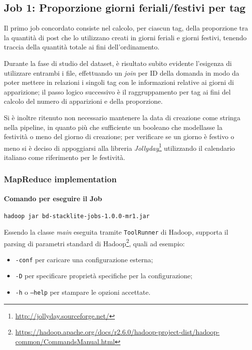 

\subsection{Job 1: Proporzione giorni feriali/festivi per tag}\label{subsec:job1}
  Il primo job concordato consiste nel calcolo, per ciascun tag, della proporzione tra la quantità di post che lo utilizzano creati in giorni feriali e giorni festivi, tenendo traccia della quantità totale ai fini dell'ordinamento.

  Durante la fase di studio del dataset, è risultato subito evidente l'esigenza di utilizzare entrambi i file,
  effettuando un \textit{join} per ID della domanda in modo da poter mettere in relazioni i singoli tag con le informazioni relative ai giorni di apparizione;
  il passo logico successivo è il raggruppamento per tag ai fini del calcolo del numero di apparizioni e della proporzione.

  Si è inoltre ritenuto non necessario mantenere la data di creazione come stringa nella pipeline, in quanto più che sufficiente un booleano che modellasse la festività o meno del giorno di creazione;
  per verificare se un giorno è festivo o meno si è deciso di appoggiarsi alla libreria \textit{Jollyday}\footnote{\url{http://jollyday.sourceforge.net/}} utilizzando il calendario italiano come riferimento per le festività.

  \subsubsection{MapReduce implementation}\label{subsub:job1:mapreduce}

  \paragraph{Comando per eseguire il Job}\label{par:job1:mapreduce:cmd}

  \texttt{hadoop jar bd-stacklite-jobs-1.0.0-mr1.jar}

  Essendo la classe \textit{main} eseguita tramite \texttt{ToolRunner} di Hadoop,
  supporta il parsing di parametri standard di Hadoop\footnote{\url{https://hadoop.apache.org/docs/r2.6.0/hadoop-project-dist/hadoop-common/CommandsManual.html}}, quali ad esempio:
  \begin{itemize}
    \item \texttt{-conf} per caricare una configurazione esterna;
    \item \texttt{-D} per specificare proprietà specifiche per la configurazione;
    \item \texttt{-h} o \texttt{--help} per stampare le opzioni accettate.
  \end{itemize}

